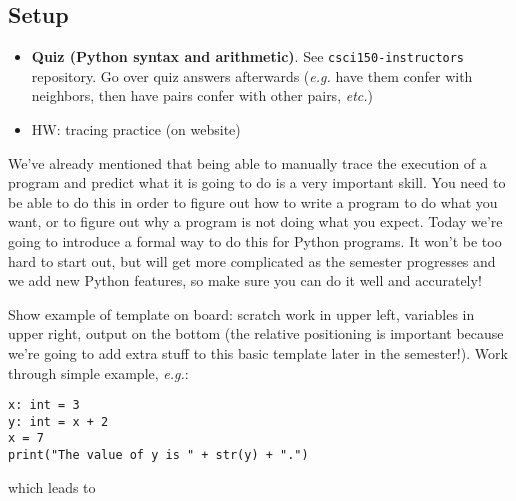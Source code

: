 \documentclass{article}
\newcommand{\etc}{\emph{etc.}\xspace}
\newcommand{\eg}{\emph{e.g.}\xspace}
\begin{document}
\subsection*{Setup}
\begin{itemize}
\item \textbf{Quiz (Python syntax and arithmetic)}.  See
  \texttt{csci150-instructors} repository.  Go over quiz answers
  afterwards (\eg have them confer with neighbors, then have
  pairs confer with other pairs, \etc)
\item HW: tracing practice (on website)
\end{itemize}

We've already mentioned that being able to manually trace the
execution of a program and predict what it is going to do is a very
important skill.  You need to be able to do this in order to figure
out how to write a program to do what you want, or to figure out why a
program is not doing what you expect.  Today we're going to introduce
a formal way to do this for Python programs.  It won't be too hard to
start out, but will get more complicated as the semester progresses
and we add new Python features, so make sure you can do it well and
accurately!

Show example of template on board: scratch work in upper left,
variables in upper right, output on the bottom (the relative
positioning is important because we're going to add extra stuff to
this basic template later in the semester!).  Work through simple
example, \eg:
\begin{verbatim}
x: int = 3
y: int = x + 2
x = 7
print("The value of y is " + str(y) + ".")
\end{verbatim}
which leads to \bigskip

 \bigskip
\end{document}
